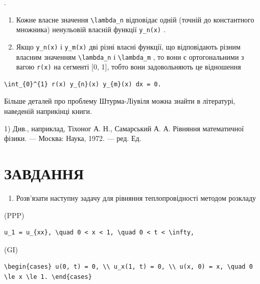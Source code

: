 \documentclass[
  ukrainian,
]{article}
\providecommand{\tightlist}{%
  \setlength{\itemsep}{0pt}\setlength{\parskip}{0pt}}
\begin{document}
.

\begin{enumerate}
\def\labelenumi{\arabic{enumi}.}
\setcounter{enumi}{1}
\item
  Кожне власне значення \texttt{\textbackslash{}lambda\_n} відповідає
  одній (точній до константного множника) ненульовій власній функції
  \texttt{y\_n(x)} .
\item
  Якщо \texttt{y\_n(x)} і \texttt{y\_m(x)} дві різні власні функції, що
  відповідають різним власним значенням
  \texttt{\textbackslash{}lambda\_n} і
  \texttt{\textbackslash{}lambda\_m} , то вони є ортогональними з вагою
  \texttt{r(x)} на сегменті {[}0, 1{]}, тобто вони задовольняють це
  відношення
\end{enumerate}

\begin{verbatim}
\int_{0}^{1} r(x) y_{n}(x) y_{m}(x) dx = 0.
\end{verbatim}

Більше деталей про проблему Штурма-Ліувіля можна знайти в літературі,
наведеній наприкінці книги.

1) Див., наприклад, Тіхоног А. Н., Самарський А. А. Рівняння
математичної фізики. --- Москва: Наука, 1972. --- ред. Ед.

\section{ЗАВДАННЯ}\label{ux437ux430ux432ux434ux430ux43dux43dux44f-3}

\begin{enumerate}
\def\labelenumi{\arabic{enumi}.}
\tightlist
\item
  Розв'язати наступну задачу для рівняння теплопровідності методом
  розкладу
\end{enumerate}

(PPP)

\begin{verbatim}
u_1 = u_{xx}, \quad 0 < x < 1, \quad 0 < t < \infty,
\end{verbatim}

(GI)

\begin{verbatim}
\begin{cases} u(0, t) = 0, \\ u_x(1, t) = 0, \\ u(x, 0) = x, \quad 0 \le x \le 1. \end{cases}
\end{verbatim}
\end{document}
